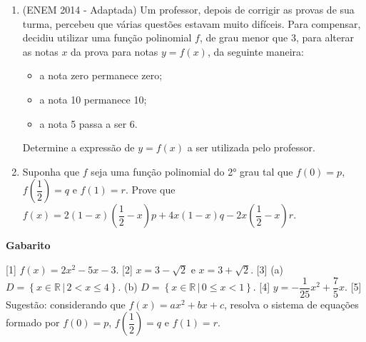 \documentclass[12pt,a4paper]{article}
\begin{document}
\begin{enumerate}
  \item (ENEM 2014 - Adaptada) Um professor, depois de corrigir as provas de sua turma, percebeu que várias questões estavam 
 muito difíceis. Para compensar, decidiu utilizar uma função polinomial $f$, de grau menor que 3, para alterar as notas $x$ da prova para notas $y = f(x)$, 
 da seguinte maneira:
 
 \begin{itemize}
  \item a nota zero permanece zero;
  \item a nota 10 permanece 10;
  \item a nota 5 passa a ser 6.
 \end{itemize}

 Determine a expressão de $y = f(x)$ a ser utilizada pelo professor.
  
  \item Suponha que $f$ seja uma função polinomial do 2° grau tal que
  $f(0) = p$, $f\left(\dfrac{1}{2}\right) = q$ e $f(1) = r$. Prove 
  que $f(x) = 2(1 - x)\left(\dfrac{1}{2} - x\right)p + 4x(1 - x)q - 2x\left(\dfrac{1}{2} - x\right)r$.

\end{enumerate}

\begin{center}
  \textbf{Gabarito}
\end{center}

[1] $f(x) = 2x^2 - 5x - 3$.
[2] $x = 3 - \sqrt{2}$ e $x = 3 + \sqrt{2}$.
[3] 
(a) $D = \left\{x\in \mathbb{R}\,|\, 2 < x \leq 4\right\}$. 
(b) $D = \left\{x\in \mathbb{R}\,|\, 0 \leq x < 1\right\}$. 
[4] $y = -\dfrac{1}{25}x^2 + \dfrac{7}{5}x$. 
[5] Sugestão: considerando que $f(x) = ax^2 + bx + c$, resolva o sistema de equações formado por 
$f(0) = p$, $f\left(\dfrac{1}{2}\right) = q$ e $f(1) = r$.  
\end{document}
